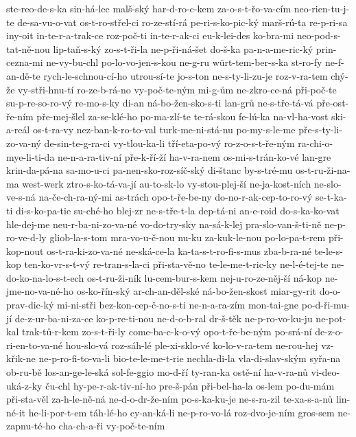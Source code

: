 {ste-reo-de-s-ka
sin-há-lec
malš-ský
har-d-ro-c-kem
za-o-s-t-řo-va-cím
neo-rien-tu-j-te
de-sa-vu-o-vat
os-t-ro-střel-ci
ro-ze-stí-rá
pe-ri-s-ko-pic-ký
marš-rú-ta
re-p-ri-sa
iny-oit
in-te-r-a-trak-ce
roz-poč-ti
in-te-r-ak-ci
eu-k-lei-des
ko-bra-mi
neo-pod-s-tat-ně-nou
lip-taň-s-ký
zo-s-t-ři-la
ne-p-ři-ná-šet
do-š-ka
pa-n-a-me-ric-ký
prin-cezna-mi
ne-vy-bu-chl
po-lo-vo-jen-s-kou
ne-g-ru
würt-tem-ber-s-ka
st-ro-fy
ne-f-an-dě-te
rych-le-schnou-cí-ho
utrou-sí-te
jo-s-ton
ne-s-ty-li-zu-je
roz-v-ra-tem
chý-že
vy-stři-hnu-tí
ro-ze-b-rá-no
vy-poč-te-ným
mi-g-ům
ne-zkro-ce-ná
při-poč-te
su-p-re-so-ro-vý
re-mo-s-ky
di-an
ná-bo-žen-sko-s-ti
lan-grů
ne-s-tře-tá-vá
pře-ost-ře-ním
pře-mej-šlel
za-se-klé-ho
po-ma-zlí-te
te-rá-skou
fe-lú-ka
na-vl-ha-vost
ski-a-reál
os-t-ra-vy
nez-ban-k-ro-to-val
turk-me-ni-stá-nu
po-my-s-le-me
pře-s-ty-li-zo-va-ný
de-sin-te-g-ra-ci
vy-tlou-ka-li
tří-eta-po-vý
ro-z-o-s-t-ře-ným
ra-chi-o-mye-li-ti-da
ne-n-a-ra-tiv-ní
pře-k-ří-ží
ha-v-ra-nem
os-mi-s-trán-ko-vé
lan-gre
krin-da-pá-na
sa-mo-u-ci
pa-nen-sko-roz-síč-ský
di-štanc
by-s-tré-mu
os-t-ru-ži-na-ma
west-werk
ztro-s-ko-tá-va-jí
au-to-sk-lo
vy-stou-plej-ší
ne-ja-kost-ních
ne-slo-ve-s-ná
na-če-ch-ra-ný-mi
as-trách
opo-t-ře-be-ny
do-no-r-ak-cep-to-ro-vý
se-t-ka-ti
di-s-ko-pa-tie
su-ché-ho
blej-zr
ne-s-tře-t-la
dep-tá-ni
an-e-roid
do-s-ka-ko-vat
hle-dej-me
neu-r-ba-ni-zo-va-né
vo-do-try-sky
na-sá-k-lej
pra-slo-van-š-ti-ně
ne-p-ro-ve-d-ly
gliob-la-s-tom
mra-vo-u-č-nou
nu-ku
za-kuk-le-nou
po-lo-pa-t-rem
při-kop-nout
os-t-ra-ki-zo-va-né
ne-ská-ce-la
ka-ta-s-t-ro-fi-s-mus
zba-b-ra-né
te-le-s-kop
ten-ko-vr-s-t-vý
re-tran-s-la-ci
při-sta-vě-no
te-le-me-t-ric-ky
ne-l-é-tej-te
ne-do-ko-na-lo-s-t-ech
os-t-ru-ži-ník
lu-cem-bur-s-kem
nej-u-ro-ze-něj-ší
ná-kop
ne-jme-no-va-né-ho
os-ko-řín-ský
ar-ch-an-děl-ské
ná-bo-žen-skost
miar-gy-rit
do-o-prav-dic-ký
mi-ni-stři
bez-kon-cep-č-no-s-ti
ne-n-a-ra-zím
mon-tai-gne
po-d-ři-mu-jí
de-z-ur-ba-ni-za-ce
ko-p-re-ti-nou
ne-d-o-b-ral
dr-š-těk
ne-p-ro-vo-ku-ju
ne-pot-kal
trak-tů-r-kem
zo-s-t-ři-ly
come-ba-c-k-o-vý
opo-t-ře-be-ným
po-srá-ní
de-z-o-ri-en-to-va-né
hou-slo-vá
roz-sáh-lé
ple-xi-sklo-vé
ko-lo-v-ra-tem
ne-rou-hej
vz-křik-ne
ne-p-ro-fi-to-va-li
bio-te-le-me-t-rie
nechla-di-la
vla-di-slav-ským
syřa-na
ob-ru-bě
los-an-ge-le-ská
sol-fe-ggio
mo-d-ří
ty-ran-ka
ostě-ní
ha-v-ra-nů
vi-deo-uká-z-ky
ču-chl
hy-pe-r-ak-tiv-ní-ho
pre-š-pán
při-bel-ha-la
os-lem
po-du-mám
při-sta-věl
za-h-le-ně-ná
ne-d-o-dr-že-ním
po-s-ka-ku-je
ne-s-ra-zil
te-xa-s-a-nů
lin-né-it
he-li-por-t-em
táh-lé-ho
cy-an-ká-li
ne-p-ro-vo-lá
roz-dvo-je-ním
gros-sem
ne-zapnu-té-ho
cha-ch-a-ři
vy-poč-te-ním
}
